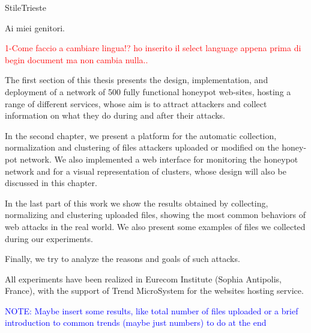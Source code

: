 \documentclass[pdfa%
,cucitura%
]{toptesi}
\begin{document}

\expandafter\ifx\csname StileTrieste\endcsname\relax
    \frontespizio
\else
    \paginavuota
    \begin{dedica}
        Ai miei genitori.
    \end{dedica}
    \tomo
\fi


\sommario

\textcolor{red}{1-Come faccio a cambiare lingua!? ho inserito il select language appena prima di begin document ma non cambia nulla..\\}

The first section of this thesis presents the design, implementation, and deployment of a network of 500 fully functional honeypot web-sites, hosting a range of different services, whose aim is to attract attackers and collect information on what they do during and after their attacks.

In the second chapter, we present a platform for the automatic collection, normalization and clustering of files attackers uploaded or modified on the honey-pot network. We also implemented a web interface for monitoring the honeypot network and for a visual representation of clusters, whose design will also be discussed in this chapter.

In the last part of this work we show the results obtained by collecting, normalizing and clustering uploaded files, showing the most common behaviors of web attacks in the real world. We also present some examples of files we collected during our experiments.

Finally, we try to analyze the reasons and goals of such attacks.

All experiments have been realized in Eurecom Institute (Sophia Antipolis, France), with the support of Trend MicroSystem for the websites hosting service.

\textcolor{blue}{NOTE: Maybe insert some results, like total number of files uploaded or a brief introduction to common trends (maybe just numbers) to do at the end}



\end{document}
